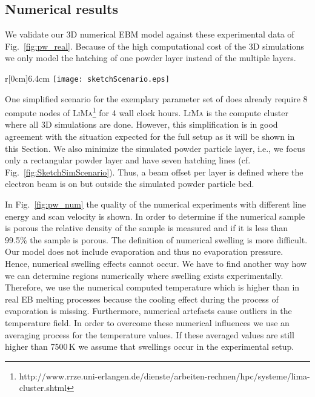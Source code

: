 \subsection{Numerical results}
We validate our 3D numerical EBM model against these experimental data of Fig.~\ref{fig:pw_real}. 
Because of the high computational cost of the 3D simulations we only model the hatching of one powder 
layer instead of the multiple layers.
\begin{wrapfigure}{r}[0cm]{6.4cm}
\centering 
 \texttt{[image: sketchScenario.eps]}
\caption{Sketch of simulation scenario.}\label{fig:SketchSimScenario}
 \vspace{-10pt}
\end{wrapfigure} 
One simplified scenario for the exemplary parameter set of  does already require 8 compute 
nodes of \textsc{LiMa}\footnote{http://www.rrze.uni-erlangen.de/dienste/arbeiten-rechnen/hpc/systeme/lima-cluster.shtml} for 4 wall clock hours.  
\textsc{LiMa} is the compute cluster where all 3D simulations are done. However, this simplification is in good agreement with the situation
expected for the full setup as it will be shown in this Section. 
We also minimize the simulated powder particle layer, i.e., we focus only a rectangular powder layer and have seven hatching 
lines (cf. Fig.~\ref{fig:SketchSimScenario}). Thus, a beam offset per layer is defined where the electron beam is on but outside 
the simulated powder particle bed. 

In Fig.~\ref{fig:pw_num} the quality of the numerical experiments with different line energy and scan velocity is shown. 
In order to determine if the numerical sample is porous the relative density of the sample is measured and if it is less than 99.5\% the 
sample is porous. The definition of numerical swelling is more difficult. Our model does not include evaporation and thus no evaporation pressure. 
Hence, numerical swelling effects cannot occur. We have to find another way how we can determine regions numerically where swelling exists experimentally. 
Therefore, we use the numerical computed temperature which is higher than in real EB melting processes because the cooling effect during the process of evaporation is missing.  
Furthermore, numerical artefacts cause outliers in the temperature field. 
In order to overcome these numerical influences we use an averaging process for the temperature values. If these averaged values are still higher than 7500\,K 
we assume that swellings occur in the experimental setup.

